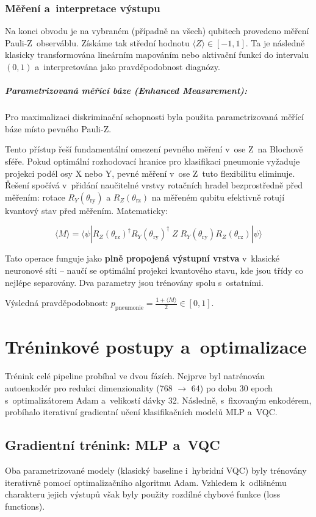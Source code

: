 \documentclass[12pt, a4paper]{report}
\begin{document}
\subsubsection{Měření a~interpretace výstupu}
Na konci obvodu je na vybraném (případně na všech) qubitech provedeno měření Pauli-Z~observáblu. Získáme tak střední hodnotu $\langle Z \rangle \in [-1, 1]$. Ta je následně klasicky transformována lineárním mapováním nebo aktivační funkcí do intervalu $(0, 1)$ a~interpretována jako pravděpodobnost diagnózy.

\subparagraph{Parametrizovaná měřící báze (Enhanced Measurement):}
Pro maximalizaci diskriminační schopnosti byla použita parametrizovaná měřící báze místo pevného Pauli-Z. 

Tento přístup řeší fundamentální omezení pevného měření v~ose Z~na Blochově sféře. Pokud optimální rozhodovací hranice pro klasifikaci pneumonie vyžaduje projekci podél osy X nebo Y, pevné měření v~ose Z~tuto flexibilitu eliminuje. Řešení spočívá v~přidání naučitelné vrstvy rotačních hradel bezprostředně před měřením: rotace $R_Y(\theta_{\text{ry}})$ a $R_Z(\theta_{\text{rz}})$ na měřeném qubitu efektivně rotují kvantový stav před měřením. Matematicky:

\begin{equation}
    \langle M \rangle = \langle \psi | R_Z(\theta_{\text{rz}})^\dagger R_Y(\theta_{\text{ry}})^\dagger \; Z \; R_Y(\theta_{\text{ry}}) R_Z(\theta_{\text{rz}}) | \psi \rangle
\end{equation}

Tato operace funguje jako \textbf{plně propojená výstupní vrstva} v~klasické neuronové síti -- naučí se optimální projekci kvantového stavu, kde jsou třídy co nejlépe separovány. Dva parametry jsou trénovány spolu s~ostatními.

Výsledná pravděpodobnost: $p_{\text{pneumonie}} = \frac{1 + \langle M \rangle}{2} \in [0,1]$.

\section{Tréninkové postupy a~optimalizace} \label{sec:training}

Trénink celé pipeline probíhal ve dvou fázích. Nejprve byl natrénován autoenkodér pro redukci dimenzionality (768 $\to$ 64) po dobu 30 epoch s~optimalizátorem Adam a~velikostí dávky 32. Následně, s~fixovaným enkodérem, probíhalo iterativní gradientní učení klasifikačních modelů MLP a~VQC.

\subsection{Gradientní trénink: MLP a~VQC}
Oba parametrizované modely (klasický baseline i~hybridní VQC) byly trénovány iterativně pomocí optimalizačního algoritmu Adam. Vzhledem k~odlišnému charakteru jejich výstupů však byly použity rozdílné chybové funkce (loss functions).
\end{document}
